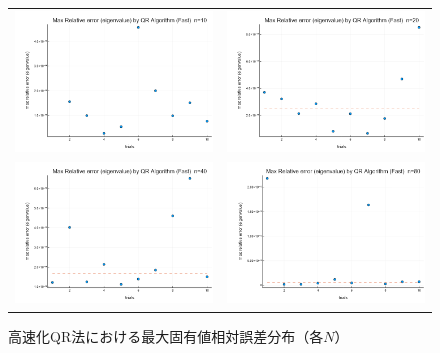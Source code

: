 \documentclass[a4paper,11pt]{ltjsarticle}
\begin{document}
\begin{figure}[H]
  \centering
  \begin{tabular}{cc}
    \includegraphics[width=72mm]{graphs/exp6_n10_max_relerr_eigenvalue.png} &
    \includegraphics[width=72mm]{graphs/exp6_n20_max_relerr_eigenvalue.png} \\
    \includegraphics[width=72mm]{graphs/exp6_n40_max_relerr_eigenvalue.png} &
    \includegraphics[width=72mm]{graphs/exp6_n80_max_relerr_eigenvalue.png} \\
  \end{tabular}
  \caption{高速化QR法における最大固有値相対誤差分布（各$N$）}
  \label{fig:exp6_relerrs}
\end{figure}
\end{document}
